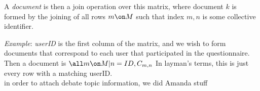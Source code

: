 A \emph{document} is then a join operation over this matrix, where document $k$ is formed by the joining of all rows $m \on M$ such that index $m,n$ is some collective identifier.

\emph{Example}: \emph{userID} is the first column of the matrix, and we wish to form documents that correspond to each user that participated in the questionnaire. Then a document is $\all m \on M | n = ID ,C_{m,n}$ In layman's terms, this is just every row with a matching userID.\\

in order to attach debate topic information, we did Amanda stuff

